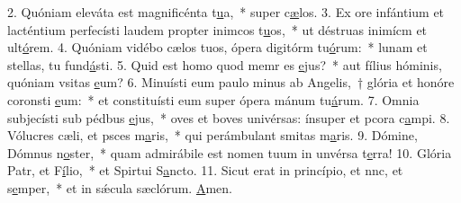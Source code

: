 2. Quóniam eleváta est magnificénta t\uline{u}a,~* super c\uline{æ}los.
3. Ex ore infántium et lacténtium perfecísti laudem propter inimcos t\uline{u}os,~* ut déstruas inimícm et ult\uline{ó}rem.
4. Quóniam vidébo cælos tuos, ópera digitórm tu\uline{ó}rum:~* lunam et stellas,  tu fund\uline{á}sti.
5. Quid est homo quod memr es \uline{e}jus?~* aut fílius hóminis, quóniam vsitas \uline{e}um?
6. Minuísti eum paulo minus ab Angelis,~† glória et honóre coronsti \uline{e}um:~* et constituísti eum super ópera mánum tu\uline{á}rum.
7. Omnia subjecísti sub pédbus \uline{e}jus,~* oves et boves univérsas: ínsuper et pcora c\uline{a}mpi.
8. Vólucres cæli, et psces m\uline{a}ris,~* qui perámbulant smitas m\uline{a}ris.
9. Dómine, Dómnus n\uline{o}ster,~* quam admirábile est nomen tuum in unvérsa t\uline{e}rra!
10. Glória Patr, et F\uline{í}lio,~* et Spirtui S\uline{a}ncto.
11. Sicut erat in princípio, et nnc, et s\uline{e}mper,~* et in sǽcula sæclórum. \uline{A}men.

